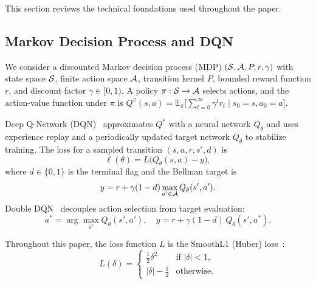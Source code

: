 
This section reviews the technical foundations used throughout the paper.

\subsection{Markov Decision Process and DQN}

We consider a discounted Markov decision process (MDP)
$(\mathcal{S}, \mathcal{A}, P, r, \gamma)$ with state space $\mathcal{S}$, finite action
space $\mathcal{A}$, transition kernel $P$, bounded reward function $r$, and
discount factor $\gamma \in [0,1)$. A policy $\pi : \mathcal{S} \to \mathcal{A}$
selects actions, and the action-value function under $\pi$ is
$Q^\pi(s,a) = \mathbb{E}_\pi\bigl[\sum_{t=0}^{\infty} \gamma^t r_t
\mid s_0 = s, a_0 = a\bigr]$.

Deep Q-Network (DQN)~\cite{mnih2015dqn} approximates $Q^*$ with a neural
network $Q_\theta$ and uses experience replay and a periodically updated target
network $Q_{\bar\theta}$ to stabilize training. The loss for a sampled
transition $(s, a, r, s', d)$ is
\begin{equation}\label{eq:dqn-loss}
  \ell(\theta) = L\bigl(Q_\theta(s,a) - y\bigr),
\end{equation}
where $d \in \{0,1\}$ is the terminal flag and the Bellman target is
\begin{equation}\label{eq:bellman-target}
  y = r + \gamma (1 - d) \max_{a' \in \mathcal{A}} Q_{\bar\theta}(s', a').
\end{equation}
Double DQN~\cite{hasselt2016double} decouples action selection from target
evaluation:
\begin{equation}\label{eq:ddqn-target}
  a^* = \arg\max_{a'} Q_\theta(s', a'), \quad
  y = r + \gamma (1 - d)\, Q_{\bar\theta}(s', a^*).
\end{equation}

Throughout this paper, the loss function $L$ is the SmoothL1 (Huber)
loss~\cite{huber1964robust, girshick2015fastrcnn}:
\begin{equation}\label{eq:smoothl1}
  L(\delta) =
  \begin{cases}
    \tfrac{1}{2}\delta^2 & \text{if } |\delta| < 1,\\
    |\delta| - \tfrac{1}{2} & \text{otherwise.}
  \end{cases}
\end{equation}

